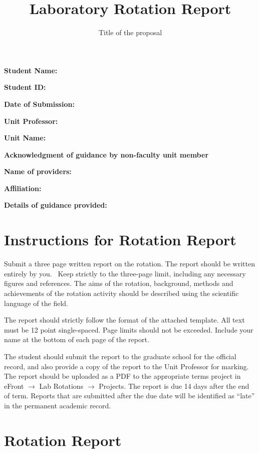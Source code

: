 \documentclass[paper=a4wide, fontsize=12pt]{scrartcl}	 %
\title{\vspace{-1.8cm}  \color{DarkRed} Laboratory Rotation Report}
\subtitle{Title of the proposal %
\vspace{-2cm} }
\date{} %
\begin{document}
\maketitle %
\thispagestyle{fancy} %


\vspace{-0.5cm} \textbf{Student Name:}  

\textbf{Student ID:} 

\textbf{Date of Submission:}

\textbf{Unit Professor:} 

\textbf{Unit Name:} 				

\vspace{3mm} \textbf{Acknowledgment of guidance by non-faculty unit member} 

\textbf{Name of providers:}

\textbf{Affiliation:}

\textbf{Details of guidance provided:}	


\vspace{0.5cm}

\section*{Instructions for Rotation Report}

Submit a three page written report on the rotation. The report should be written entirely by you.  Keep strictly to the three-page limit, including any necessary figures and references. The aims of the rotation, background, methods and achievements of the rotation activity should be described using the scientific language of the field.

The report should strictly follow the format of the attached template. All text must be 12 point single-spaced. Page limits should not be exceeded. Include your name at the bottom of each page of the report.

 The student should submit the report to the graduate school for the official record, and also provide a copy of the report to the Unit Professor for marking. The report should be uploaded as a PDF to the appropriate terms project in eFront $\rightarrow$ Lab Rotations  $\rightarrow$ Projects. The report is due 14 days after the end of term. Reports that are submitted after the due date will be identified as ``late'' in the permanent academic record.


\section*{Rotation Report}
\end{document}
